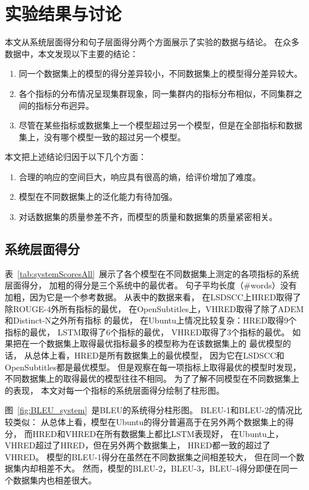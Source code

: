 \chapter{实验结果与讨论}\label{ch:experiment}
本文从系统层面得分和句子层面得分两个方面展示了实验的数据与结论。
在众多数据中，本文发现以下主要的结论：
\begin{enumerate}
    \item 同一个数据集上的模型的得分差异较小，不同数据集上的模型得分差异较大。
    \item 各个指标的分布情况呈现集群现象，同一集群内的指标分布相似，不同集群之间的指标分布迥异。
    \item 尽管在某些指标或数据集上一个模型超过另一个模型，但是在全部指标和数据集上，没有哪个模型一致的超过另一个模型。
\end{enumerate}
本文把上述结论归因于以下几个方面：
\begin{enumerate}
    \item 合理的响应的空间巨大，响应具有很高的熵，给评价增加了难度。
    \item 模型在不同数据集上的泛化能力有待加强。
    \item 对话数据集的质量参差不齐，而模型的质量和数据集的质量紧密相关。
\end{enumerate}

\section{系统层面得分}\label{sec:system_scores}
表~\ref{tab:systemScoresAll}~展示了各个模型在不同数据集上测定的各项指标的系统层面得分，
加粗的得分是三个系统中的最优者。
句子平均长度（\#words）没有加粗，因为它是一个参考数据。
从表中的数据来看，
在LSDSCC上HRED取得了除ROUGE-4外所有指标的最优，
在OpenSubtitles上，VHRED取得了除了ADEM和Distinct-N之外所有指标
的最优，
在Ubuntu上情况比较复杂：HRED取得9个指标的最优，
LSTM取得了6个指标的最优，
VHRED取得了3个指标的最优。
如果把在一个数据集上取得最优指标最多的模型称为在该数据集上的
最优模型的话，
从总体上看，HRED是所有数据集上的最优模型，
因为它在LSDSCC和OpenSubtitles都是最优模型。
但是观察在每一项指标上取得最优的模型时发现，
不同数据集上的取得最优的模型往往不相同。
为了了解不同模型在不同数据集上的表现，
本文对每一个指标的系统层面得分绘制了柱形图。


图~\ref{fig:BLEU_system}~是BLEU的系统得分柱形图。
BLEU-1和BLEU-2的情况比较类似：
从总体上看，模型在Ubuntu的得分普遍高于在另外两个数据集上的得分，
而HRED和VHRED在所有数据集上都比LSTM表现好，
在Ubuntu上，VHRED超过了HRED，但在另外两个数据集上，
HRED都一致的超过了VHRED。
模型的BLEU-1得分在虽然在不同数据集之间相差较大，
但在同一个数据集内却相差不大。
然而，模型的BLEU-2，BLEU-3，BLEU-4得分即便在同一个数据集内也相差很大。


